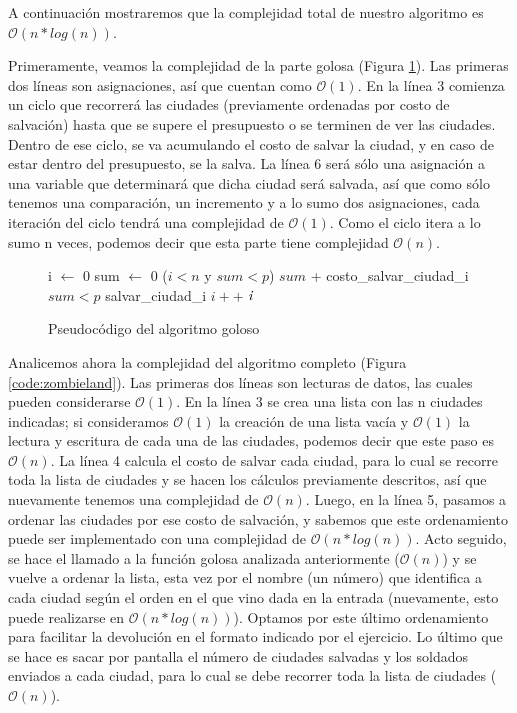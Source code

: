 \vspace*{0.3cm}

A continuación mostraremos que la complejidad total de nuestro algoritmo es $\mathcal{O}(n*log(n))$.

Primeramente, veamos la complejidad de la parte golosa (Figura \ref{code:goloso}).  Las primeras dos líneas son asignaciones, así que cuentan como $\mathcal{O}(1)$. En la línea 3 comienza un ciclo que recorrerá las ciudades (previamente ordenadas por costo de salvación) hasta que se supere el presupuesto o se terminen de ver las ciudades. Dentro de ese ciclo, se va acumulando el costo de salvar la ciudad, y en caso de estar dentro del presupuesto, se la salva.  La línea 6 será sólo una asignación a una variable que determinará que dicha ciudad será salvada, así que como sólo tenemos una comparación, un incremento y a lo sumo dos asignaciones, cada iteración del ciclo tendrá una complejidad de $\mathcal{O}(1)$.  Como el ciclo itera a lo sumo n veces, podemos decir que esta parte tiene complejidad $\mathcal{O}(n)$.

\begin{figure}[!ht]
\begin{codebox}
\li i $\leftarrow$ 0
\li sum $\leftarrow$ 0
\li \While ($i<n$ y $sum<p$)    
\li 	\quad	$sum$ + costo_salvar_ciudad_i   
\li	\quad	\If $sum<p$
\li	\quad\quad	salvar_ciudad_i
\li	\quad	$i++$
\li \Return $\id{i}$       
\end{codebox} 
\caption{Pseudocódigo del algoritmo goloso}\label{code:goloso}
\end{figure}
\FloatBarrier

Analicemos ahora la complejidad del algoritmo completo (Figura \ref{code:zombieland}). Las primeras dos líneas son lecturas de datos, las cuales pueden considerarse $\mathcal{O}(1)$.  En la línea 3 se crea una lista con las n ciudades indicadas; si consideramos $\mathcal{O}(1)$ la creación de una lista vacía y $\mathcal{O}(1)$ la lectura y escritura de cada una de las ciudades, podemos decir que este paso es $\mathcal{O}(n)$.  La línea 4 calcula el costo de salvar cada ciudad, para lo cual se recorre toda la lista de ciudades y se hacen los cálculos previamente descritos, así que nuevamente tenemos una complejidad de $\mathcal{O}(n)$.  Luego, en la línea 5, pasamos a ordenar las ciudades por ese costo de salvación, y sabemos que este ordenamiento puede ser implementado con una complejidad de $\mathcal{O}(n*log(n))$. Acto seguido, se hace el llamado a la función golosa analizada anteriormente ($\mathcal{O}(n)$) y se vuelve a ordenar la lista, esta vez por el nombre (un número) que identifica a cada ciudad según el orden en el que vino dada en la entrada (nuevamente, esto puede realizarse en $\mathcal{O}(n*log(n))$). Optamos por este último ordenamiento para facilitar la devolución en el formato indicado por el ejercicio.  Lo último que se hace es sacar por pantalla el número de ciudades salvadas y los soldados enviados a cada ciudad, para lo cual se debe recorrer toda la lista de ciudades ($\mathcal{O}(n)$).

